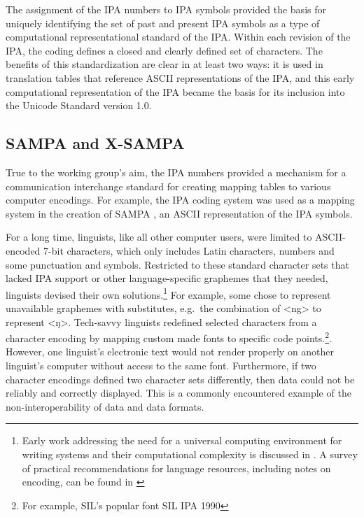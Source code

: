 The assignment of the IPA numbers to IPA symbols provided the basis for 
uniquely identifying the set of past and present IPA symbols as a type of 
computational representational standard of the IPA. Within each revision 
of the IPA, the coding defines a closed and clearly defined set of characters. 
The benefits of this standardization are clear in at least two ways: it is 
used in translation tables that reference ASCII representations of the IPA, 
and this early computational representation of the IPA became the basis for 
its inclusion into the Unicode Standard version 1.0.

\subsection{SAMPA and X-SAMPA}

True to the working group's aim, the IPA numbers provided a mechanism for 
a communication interchange standard for creating mapping tables to various 
computer encodings. For example, the IPA coding system was used as a mapping 
system in the creation of SAMPA \citep{Wells_etal1992}, an ASCII representation 
of the IPA symbols. 

For a long time, linguists, like all other computer users, were
limited to ASCII-encoded 7-bit characters, which only includes Latin characters,
numbers and some punctuation and symbols. Restricted to these standard character
sets that lacked IPA support or other language-specific graphemes that they
needed, linguists devised their own solutions.\footnote{Early work addressing
the need for a universal computing environment for writing systems and their
computational complexity is discussed in \citet{Simons1989}. A survey of
practical recommendations for language resources, including notes on encoding,
can be found in \citet{BirdSimons2003}} For example, some chose to represent
unavailable graphemes with substitutes, e.g.~the combination of <ng> to
represent <ŋ>. Tech-savvy linguists redefined selected characters from a
character encoding by mapping custom made fonts to specific code points.\footnote{For 
example, SIL's popular font SIL IPA 1990}. However,
one linguist's electronic text would not render properly on another linguist's
computer without access to the same font. Furthermore, if two character encodings
defined two character sets differently, then data could not be reliably and
correctly displayed. This is a commonly encountered example of the non-interoperability of
data and data formats.

